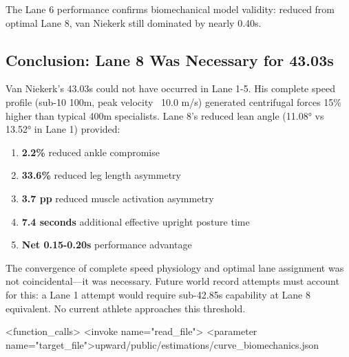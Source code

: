 The Lane 6 performance confirms biomechanical model validity: reduced from optimal Lane 8, van Niekerk still dominated by nearly 0.40s.

\subsection{Conclusion: Lane 8 Was Necessary for 43.03s}

Van Niekerk's 43.03s could not have occurred in Lane 1-5. His complete speed profile (sub-10 100m, peak velocity ~10.0 m/s) generated centrifugal forces 15\% higher than typical 400m specialists. Lane 8's reduced lean angle (11.08° vs 13.52° in Lane 1) provided:

\begin{enumerate}
    \item \textbf{2.2\%} reduced ankle compromise
    \item \textbf{33.6\%} reduced leg length asymmetry
    \item \textbf{3.7 pp} reduced muscle activation asymmetry
    \item \textbf{7.4 seconds} additional effective upright posture time
    \item \textbf{Net 0.15-0.20s} performance advantage
\end{enumerate}

The convergence of complete speed physiology and optimal lane assignment was not coincidental—it was necessary. Future world record attempts must account for this: a Lane 1 attempt would require sub-42.85s capability at Lane 8 equivalent. No current athlete approaches this threshold.

<function_calls>
<invoke name="read_file">
<parameter name="target_file">upward/public/estimations/curve_biomechanics.json
